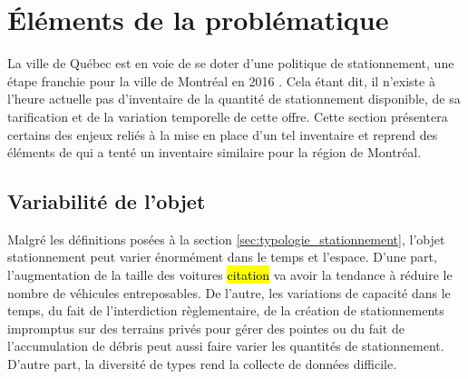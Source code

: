 



\section{Éléments de la problématique}\label{sec:Problematique}  %
La ville de Québec est en voie de se doter d'une politique de stationnement, une étape franchie pour la ville de Montréal en 2016 \parencite{VilledeMontreal:PolitiqueStationnement:2016}. Cela étant dit, il n'existe à l'heure actuelle pas d'inventaire de la quantité de stationnement disponible, de sa tarification et de la variation temporelle de cette offre. Cette section présentera certains des enjeux reliés à la mise en place d'un tel inventaire et reprend des éléments de \parencite{Bourdeau:MethodologieAnalyse:2014} qui a tenté un inventaire similaire pour la région de Montréal.\par

\subsection{Variabilité de l'objet}
Malgré les définitions posées à la section \ref{sec:typologie_stationnement}, l'objet stationnement peut varier énormément dans le temps et l'espace. D'une part, l'augmentation de la taille des voitures \hl{citation} va avoir la tendance à réduire le nombre de véhicules entreposables. De l'autre, les variations de capacité dans le temps, du fait de l'interdiction règlementaire, de la création de stationnements impromptus sur des terrains privés pour gérer des pointes ou du fait de l'accumulation de débris peut aussi faire varier les quantités de stationnement. D'autre part, la diversité de types rend la collecte de données difficile.


